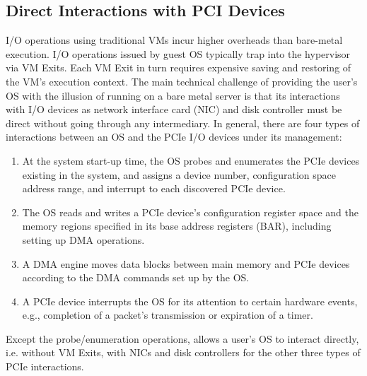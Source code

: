 \subsection{Direct Interactions with PCI Devices}

I/O operations using traditional VMs incur higher overheads than bare-metal execution. 
I/O operations issued by guest OS typically trap into the hypervisor via VM Exits. 
Each VM Exit in turn requires expensive saving and restoring of the VM's execution context.
The main technical challenge of providing the user's OS with the illusion of running on 
a bare metal server is that its interactions with I/O devices as network 
interface card (NIC) and disk controller must be direct without going through any intermediary.
In general, there are four types of interactions between an OS and the PCIe 
I/O devices under its management:

\begin{enumerate} 
\setlength\itemsep{-0.04in}
\item At the system start-up time, the OS probes and enumerates the PCIe devices existing in the system, and assigns a device number, configuration space address range, and interrupt to each discovered PCIe device.

\item The OS reads and writes a PCIe device's configuration register space and the memory regions specified in its base address registers (BAR), including setting up DMA operations.

\item A DMA engine moves data blocks between main memory and PCIe devices according to the DMA commands set up by the OS.

\item A PCIe device interrupts the OS for its attention to certain hardware events, e.g., completion of a packet's transmission or expiration of a timer.

\end{enumerate}   
Except the probe/enumeration operations, \na allows a user's OS to interact directly, i.e. without VM Exits,
with NICs and disk controllers for the other three types of PCIe interactions.

